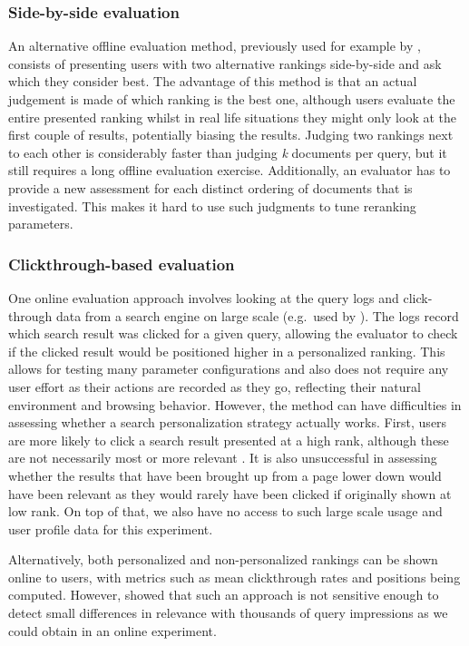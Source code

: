 \documentclass{sig-alternate}
\begin{document}
\subsubsection*{Side-by-side evaluation}

An alternative offline evaluation method, previously used for example by \cite{Thomas:Hawking}, consists of presenting users with two alternative rankings side-by-side and ask which they consider best. The advantage of this method is that an actual judgement is made of which ranking is the best one, although users evaluate the entire presented ranking whilst in real life situations they might only look at the first couple of results, potentially biasing the results. Judging two rankings next to each other is considerably faster than judging \emph{k} documents per query, but it still requires a long offline evaluation exercise. Additionally, an evaluator has to provide a new assessment for each distinct ordering of documents that is investigated. This makes it hard to use such judgments to tune reranking parameters.

\subsubsection*{Clickthrough-based evaluation}

One online evaluation approach involves looking at the query logs and click-through data from a search engine on large scale (e.g.~used by \cite{Dou:Song}). The logs record which search result was clicked for a given query, allowing the evaluator to check if the clicked result would be positioned higher in a personalized ranking. This allows for testing many parameter configurations and also does not require any user effort as their actions are recorded as they go, reflecting their natural environment and browsing behavior. However, the method can have difficulties in assessing whether a search personalization strategy actually works. First, users are more likely to click a search result presented at a high rank, although these are not necessarily most or more relevant \cite{Joachims:Granka}. It is also unsuccessful in assessing whether the results that have been brought up from a page lower down would have been relevant as they would rarely have been clicked if originally shown at low rank. On top of that, we also have no access to such large scale usage and user profile data for this experiment.

Alternatively, both personalized and non-personalized rankings can be shown online to users, with metrics such as mean clickthrough rates and positions being computed. However, \cite{Radlinski:Kurup} showed that such an approach is not sensitive enough to detect small differences in relevance with thousands of query impressions as we could obtain in an online experiment.
\end{document}
